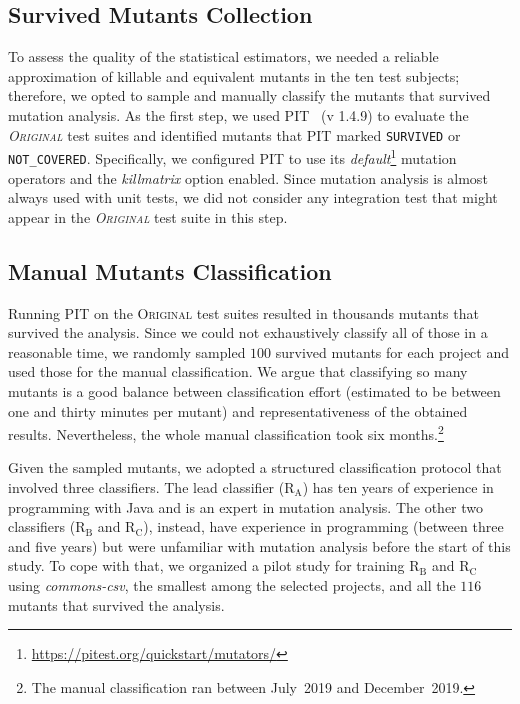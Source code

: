 \documentclass[sigconf,review,anonymous]{acmart}
\newcommand{\projectCount}{ten\xspace}
\newcommand{\rA}{\textsc{R$_\text{A}$}\xspace}
\newcommand{\rB}{\textsc{R$_\text{B}$}\xspace}
\newcommand{\rC}{\textsc{R$_\text{C}$}\xspace}
\newcommand{\original}{\textsc{Original}\xspace}
\newcommand{\PIT}{\textsc{PIT}\xspace}
\begin{document}
\subsection{Survived Mutants Collection}
\label{sec:mutant-generation}
To assess the quality of the statistical estimators, we needed a reliable approximation of
killable and equivalent mutants in the \projectCount test subjects; therefore, we opted to
sample and manually classify the mutants that survived mutation analysis.
%
As the first step, we used \PIT~\cite{pit} (v 1.4.9) to evaluate the \emph{\original} test suites
and identified mutants that \PIT marked \texttt{SURVIVED} or \texttt{NOT\_COVERED}.
%
Specifically, we configured \PIT to use its \emph{default}\footnote{\url{https://pitest.org/quickstart/mutators/}}
mutation operators and the \emph{killmatrix} option enabled.
%
Since mutation analysis is almost always used with unit
tests, we did not consider any integration test that might appear
in the \emph{\original} test suite in this step. %

\subsection{Manual Mutants Classification}
\label{sec:mutant-classification}
Running \PIT on the \original test suites resulted in thousands mutants that survived the analysis. 
Since we could not exhaustively classify all of those in a reasonable time, we randomly
sampled $100$ survived mutants for each project and used those 
for the manual classification.
%
We argue that classifying so many mutants is a good balance between classification
effort (estimated to be between one and thirty minutes per mutant) and representativeness 
of the obtained results. Nevertheless, the whole manual classification took six months.\footnote{The manual classification ran between July~2019 and December~2019.}

Given the sampled mutants, we adopted a structured classification protocol
that involved three classifiers. %
%
The lead classifier (\rA) has ten years of experience in programming with Java and is
an expert in mutation analysis. The other two classifiers (\rB and \rC), 
instead, have experience in programming (between three and five years) 
but were unfamiliar with mutation analysis before the start of this study.
%
To cope with that, we organized a pilot study for training \rB and \rC
using \emph{commons-csv}, the smallest among the selected projects, 
and all the $116$ mutants that survived the analysis.
\end{document}
